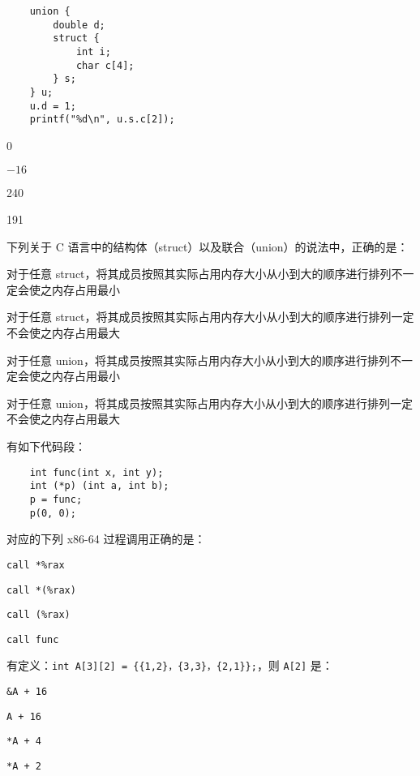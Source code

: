 \begin{problems}
\begin{verbatim}
    union {
        double d;
        struct {
            int i;
            char c[4];
        } s;
    } u;
    u.d = 1;
    printf("%d\n", u.s.c[2]);
        \end{verbatim}
        \begin{choices}
            \item 0
            \item $-16$
            \item 240
            \item 191
        \end{choices}
         下列关于 C 语言中的结构体（struct）以及联合（union）的说法中，正确的是：
        \begin{choices}
            \item 对于任意 struct，将其成员按照其实际占用内存大小从小到大的顺序进行排列不一定会使之内存占用最小
            \item 对于任意 struct，将其成员按照其实际占用内存大小从小到大的顺序进行排列一定不会使之内存占用最大
            \item 对于任意 union，将其成员按照其实际占用内存大小从小到大的顺序进行排列不一定会使之内存占用最小
            \item 对于任意 union，将其成员按照其实际占用内存大小从小到大的顺序进行排列一定不会使之内存占用最大
        \end{choices}
         有如下代码段：
        \begin{verbatim}
    int func(int x, int y);
    int (*p) (int a, int b);
    p = func;
    p(0, 0);
        \end{verbatim}
        对应的下列 x86-64 过程调用正确的是：
        \begin{choices}
            \item \verb|call *%rax|
            \item \verb|call *(%rax)|
            \item \verb|call (%rax)|
            \item \verb|call func|
        \end{choices}
         有定义：\verb|int A[3][2] = {{1,2}，{3,3}，{2,1}};|，则 \verb|A[2]| 是：
        \begin{choices}
            \item \verb|&A + 16|
            \item \verb|A + 16|
            \item \verb|*A + 4|
            \item \verb|*A + 2|

\end{choices}
\end{problems}
